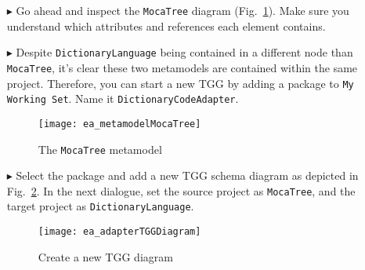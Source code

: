 \begin{itemize}

\item[$\blacktriangleright$] Go ahead and inspect the \texttt{MocaTree} diagram (Fig.~\ref{ea:mocaTree}). Make sure you understand which attributes and
references each element contains.

\item[$\blacktriangleright$] Despite \texttt{DictionaryLanguage} being contained in a different node than \texttt{MocaTree}, it's clear these two metamodels are
contained within the same project. Therefore, you can start a new TGG by adding a package to \texttt{My Working Set}. Name it
\texttt{Dict\-ion\-ary\-Code\-Adap\-ter}.

\newpage

\begin{figure}[htpb]
  \hspace{-3cm}
  \texttt{[image: ea\_metamodelMocaTree]}
  \caption{The \texttt{MocaTree} metamodel}
  \label{ea:mocaTree}
\end{figure}

\item[$\blacktriangleright$] Select the package and add a new TGG schema diagram as depicted in Fig.~\ref{ea:newTGGDiagram}. In the next dialogue,
set the source project as \texttt{MocaTree}, and the target project as \texttt{Dict\-ion\-ary\-Lang\-uage}.

\begin{figure}[h!]
\begin{center}
  \texttt{[image: ea\_adapterTGGDiagram]}
  \caption{Create a new TGG diagram}
  \label{ea:newTGGDiagram}
\end{center}
\end{figure}

\end{itemize}

\clearpage

